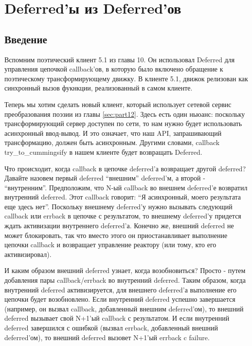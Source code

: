 
\section{Deferred'ы из Deferred'ов\label{sec:part13}}

\subsection{Введение}


Вспомним поэтический клиент 5.1 из главы 10. Он 
использовал Deferred для управления цепочкой callback'ов, 
в которую было включено обращение к поэтическому 
трансформирующему движку. В клиенте 5.1, движок 
релизован как синхронный вызов фукнкции, реализованный в 
самом клиенте.


Теперь мы хотим сделать новый клиент, который 
использует сетевой сервис преобразования поэзии 
из главы \ref{sec:part12}. Здесь есть один ньюанс: 
поскольку трансформирующий сервер доступен по сети, то 
нам нужно будет использовать асинхронный ввод-вывод. И  
это означает, что наш API, запрашивающий трансформацию,  
должен быть асинхронным. Другими словами, callback 
try\_to\_cummingsify в нашем клиенте будет возвращать Deferred. 


Что происходит, когда callback в цепочке deferred'а 
возвращает другой deferred? Давайте назовем первый 
deferred ``внешним'' deferred'м, а второй - ``внутренним''. 
Предположим, что N-ый callback во внешнем deferred'е 
возвратил внутренний deferred. Этот callback говорит: 
``Я асинхронный, моего результата еще здесь нет''. 
Поскольку внешнему deferred'у нужно вызывать следующий  
callback или errback в цепочке с результатом, то 
внешнему deferred'у придется ждать активизации 
внутреннего deferred'а. Конечно же, внешний deferred 
не может блокировать,   
так что вместо этого он приостанавливает 
выполнение цепочки callback и возвращает управление 
реактору (или тому, кто его активизировал).


И каким образом внешний deferred узнает, когда возобновиться? 
Просто - путем добавления пары callback/errback во внутренний 
deferred. Таким образом, когда внутренний deferred 
активизируется, для внешнего deferred'а выполнение его цепочки 
будет возобновлено. Если внутренний deferred успешно завершается (например, 
он вызвал callback, добавленный внешним deferred'ом), то 
внешний deferred вызывает свой N+1'ый callback с результатом. И если 
внутренний deferred завершился с ошибкой (вызвал errback, добавленный 
внешний deferred'ом), то внешний deferred вызовет N+1'ый errback c failure.   


